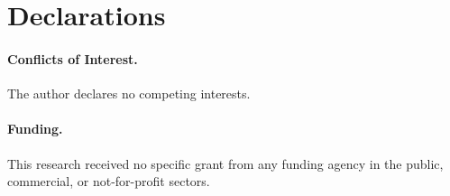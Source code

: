 \documentclass{article}
\begin{document}
\section*{Declarations}

\paragraph{Conflicts of Interest.}
The author declares no competing interests.

\paragraph{Funding.}
This research received no specific grant from any funding agency in the public, commercial, or not-for-profit sectors.
\end{document}
